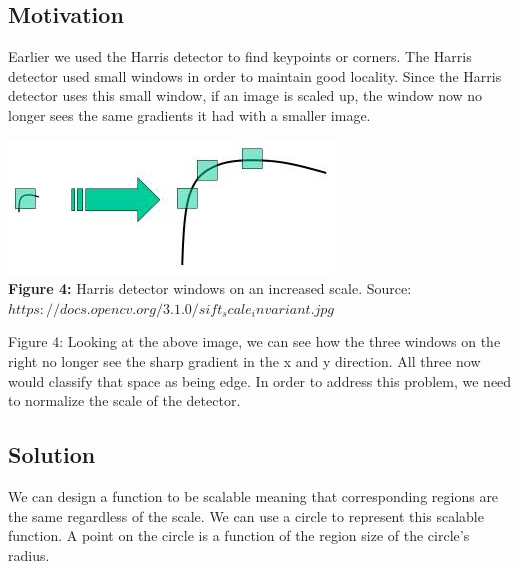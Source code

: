 \documentclass{article}
\begin{document}
\subsection{Motivation}
Earlier we used the Harris detector to find keypoints or corners. The Harris detector used small windows in order to maintain good locality. Since the Harris detector uses this small window, if an image is scaled up, the window now no longer sees the same gradients it had with a smaller image.\\
\begin{center}
	\includegraphics{sift_scale_invariant.jpg} \\
    \textbf{Figure 4:} Harris detector windows on an increased scale. Source: $https://docs.opencv.org/3.1.0/sift_scale_invariant.jpg$
\end{center}
Figure 4:
Looking at the above image, we can see how the three windows on the right no longer see the sharp gradient in the x and y direction. All three now would classify that space as being edge. In order to address this problem, we need to normalize the scale of the detector.
\subsection{Solution}
We can design a function to be scalable meaning that corresponding regions are the same regardless of the scale. We can use a circle to represent this scalable function. A point on the circle is a function of the region size of the circle's radius. 
\end{document}
